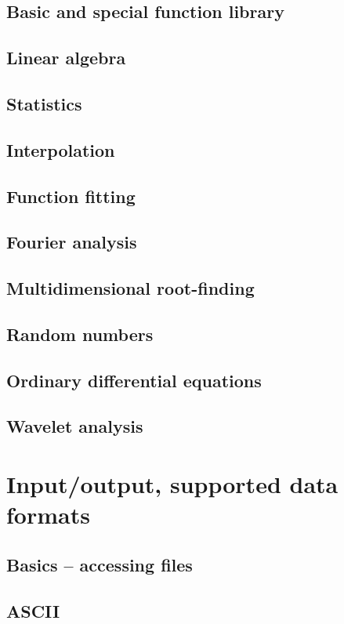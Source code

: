 \documentclass[10pt,titleauthor,openany]{mwbk}
\begin{document}
  \section{Basic and special function library}
  \section{Linear algebra}
  \section{Statistics}
  \section{Interpolation}
  \section{Function fitting}
  
  \section{Fourier analysis}
  
  \section{Multidimensional root-finding}
  
  \section{Random numbers}
  
  \section{Ordinary differential equations}
  
  \section{Wavelet analysis}

  \chapter{Input/output, supported data formats}
  \section{Basics -- accessing files}
  
  \section{ASCII}
  
\end{document}
